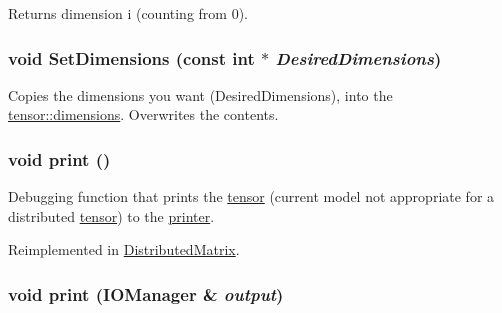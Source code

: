 Returns dimension i (counting from 0). \hypertarget{classJKBuilder_1_1tensor_ace6bcf62c74395ab9e37abc4935f66e0}{
\subsubsection[{SetDimensions}]{\setlength{\rightskip}{0pt plus 5cm}void SetDimensions (const int $\ast$ {\em DesiredDimensions})}}
\label{classJKBuilder_1_1tensor_ace6bcf62c74395ab9e37abc4935f66e0}


Copies the dimensions you want (DesiredDimensions), into the \hyperlink{classJKBuilder_1_1tensor_a2ce1e6e0782ddee097f2c4aa2663d3e9}{tensor::dimensions}. Overwrites the contents. \hypertarget{classJKBuilder_1_1tensor_a388f572c62279f839ee138a9afbdeeb5}{
\subsubsection[{print}]{\setlength{\rightskip}{0pt plus 5cm}void print ()}}
\label{classJKBuilder_1_1tensor_a388f572c62279f839ee138a9afbdeeb5}


Debugging function that prints the \hyperlink{classJKBuilder_1_1tensor}{tensor} (current model not appropriate for a distributed \hyperlink{classJKBuilder_1_1tensor}{tensor}) to the \hyperlink{classJKBuilder_1_1printer}{printer}. 

Reimplemented in \hyperlink{classJKBuilder_1_1DistributedMatrix_a388f572c62279f839ee138a9afbdeeb5}{DistributedMatrix}.\hypertarget{classJKBuilder_1_1tensor_a74b2fe351a5444c1325870dc6162f451}{
\subsubsection[{print}]{\setlength{\rightskip}{0pt plus 5cm}void print ({\bf IOManager} \& {\em output})}}
\label{classJKBuilder_1_1tensor_a74b2fe351a5444c1325870dc6162f451}


